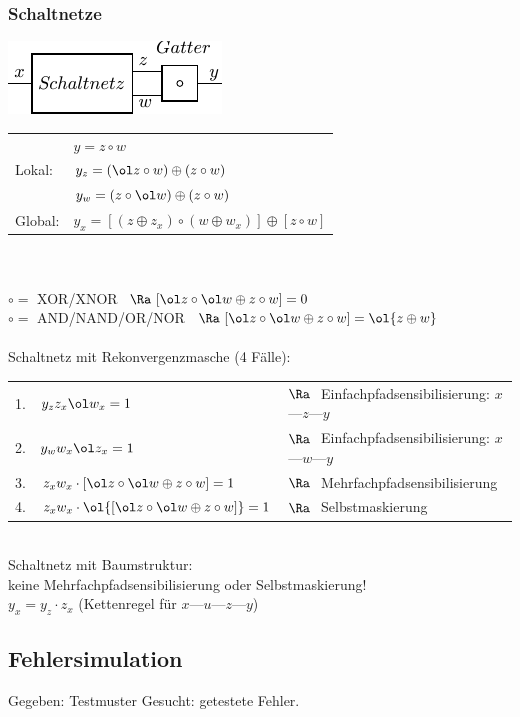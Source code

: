 \documentclass[6pt,a4paper]{scrartcl}
\begin{document}
\begin{multicols}{3}
	\subsubsection{Schaltnetze}
	\parbox{3.6cm}{
	\includegraphics{./img/ds/schaltnetz.pdf} }
	\parbox{5.0cm}{ 
	\begin{tabular}{ll}
	& $y = z \circ w$ \\
	Lokal: & $y_z = (\ol z \circ w) \oplus(z \circ w)$\\
	& $y_w = (z \circ \ol w) \oplus(z \circ w)$\\ \midrule
	Global: & $y_x = [(z \oplus z_x) \circ (w \oplus w_x)] \oplus [z \circ w]$
	\end{tabular}
	}\\[0.5em]
	\\	
	$\circ =$ XOR/XNOR $\  \Ra \ [\ol z \circ \ol w \oplus z \circ w] = 0$ \\ 
	$\circ =$ AND/NAND/OR/NOR $\ \Ra \ [\ol z \circ \ol w \oplus z \circ w] = \ol{z \oplus w}$\\
	\\
	Schaltnetz mit Rekonvergenzmasche (4 Fälle):\\
	\begin{tabular}{lll}
		1. & $y_z  z_x  \ol w_x = 1$ & $\Ra \ $ Einfachpfadsensibilisierung: $x$---$z$---$y$\\
		2. & $y_w  w_x \ol z_x = 1$ & $\Ra \ $ Einfachpfadsensibilisierung: $x$---$w$---$y$\\	
		3. & $z_x  w_x \cdot [\ol z \circ \ol w \oplus z \circ w] = 1$ & $\Ra \ $ Mehrfachpfadsensibilisierung\\[0.2em]
		4. & $z_x  w_x \cdot \ol{ [\ol z \circ \ol w \oplus z \circ w] } = 1$ & $\Ra \ $ Selbstmaskierung\\
	\end{tabular}
	\\[1em]
	Schaltnetz mit Baumstruktur: \\
	keine Mehrfachpfadsensibilisierung oder Selbstmaskierung!\\
	$y_x = y_z \cdot z_x$ (Kettenregel für $x$---$u$---$z$---$y$)\\
	
	\subsection{Fehlersimulation}
	Gegeben: Testmuster \quad	Gesucht: getestete Fehler.\\ \\

\end{multicols}
\end{document}
